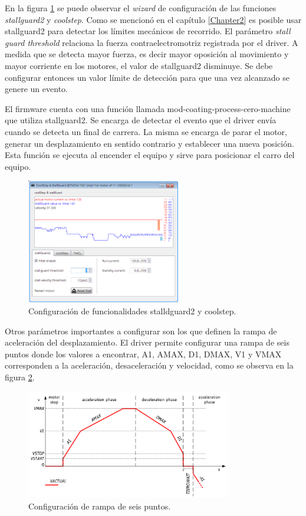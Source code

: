 En la figura \ref{fig:tmcl_ide_stall} se puede observar el \textit{wizard} de configuración de las funciones \textit{stallguard2} y \textit{coolstep}.
Como se mencionó en el capítulo \ref{Chapter2} es posible usar stallguard2 para detectar los límites mecánicos de recorrido. El parámetro \textit{stall guard threshold} relaciona la fuerza contraelectromotriz registrada por el driver. A medida que se detecta mayor fuerza, es decir mayor oposición al movimiento y mayor corriente en los motores, el valor de stallguard2 disminuye. Se debe configurar entonces un valor límite de detección para que una vez alcanzado se genere un evento.

El firmware cuenta con una función llamada mod-coating-process-cero-machine que utiliza stallguard2. Se encarga de detectar el evento que el driver envía cuando se detecta un final de carrera. La misma se encarga de parar el motor, generar un desplazamiento en sentido contrario y establecer una nueva posición. Esta función se ejecuta al encender el equipo y sirve para posicionar el carro del equipo.
 

\begin{figure}[h!]
	\centering
	\includegraphics[width=0.6\textwidth]{./Figures/tmcl_ide_2.png}
	\caption{Configuración de funcionalidades stalldguard2 y coolstep.}
	\label{fig:tmcl_ide_stall}
\end{figure}

Otros parámetros importantes a configurar son los que definen la rampa de aceleración del desplazamiento. El driver permite configurar una rampa de seis puntos donde los valores a encontrar, A1, AMAX, D1, DMAX, V1 y VMAX corresponden a la aceleración, desaceleración y velocidad, como se observa en la figura \ref{fig:rampa}.

\begin{figure}[h!]
	\centering
	\includegraphics[width=0.8\textwidth]{./Figures/rampa_1.png}
	\caption{Configuración de rampa de seis puntos.}
	\label{fig:rampa}
\end{figure}


